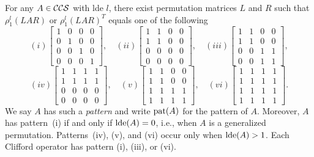 \documentclass[reprint,amsmath,amssymb,aps,pra]{revtex4-2}
\begin{document}
\begin{lemma}
  \label{lem:main}
  For any $A \in {\mathcal{CCS}}$ with lde $l$, there exist permutation
  matrices $L$ and $R$ such that $\rho_1^l(LAR)$ or $\rho_1^l(LAR)^T$
  equals one of the following
  \[
    (i)\begin{bmatrix}
      1 & 0 & 0 & 0 \\
      0 & 1 & 0 & 0 \\
      0 & 0 & 1 & 0 \\
      0 & 0 & 0 & 1
    \end{bmatrix},
    \quad(ii)\begin{bmatrix}
      1 & 1 & 0 & 0 \\
      1 & 1 & 0 & 0 \\
      0 & 0 & 0 & 0 \\
      0 & 0 & 0 & 0
    \end{bmatrix},
    \quad (iii)\begin{bmatrix}
      1 & 1 & 0 & 0 \\
      1 & 1 & 0 & 0 \\
      0 & 0 & 1 & 1 \\
      0 & 0 & 1 & 1
    \end{bmatrix},
  \]
  \[
    (iv)\begin{bmatrix}
      1 & 1 & 1 & 1 \\
      1 & 1 & 1 & 1 \\
      0 & 0 & 0 & 0 \\
      0 & 0 & 0 & 0
    \end{bmatrix},
    \quad(v)\begin{bmatrix}
      1 & 1 & 0 & 0 \\
      1 & 1 & 0 & 0 \\
      1 & 1 & 1 & 1 \\
      1 & 1 & 1 & 1
    \end{bmatrix},
    \quad(vi)\begin{bmatrix}
      1 & 1 & 1 & 1 \\
      1 & 1 & 1 & 1 \\
      1 & 1 & 1 & 1 \\
      1 & 1 & 1 & 1
    \end{bmatrix}.
  \]
  We say $A$ has such a \emph{pattern} and write $\operatorname{pat}(A)$ for the
  pattern of $A$. Moreover, $A$ has pattern~(i) if and only if
  $\operatorname{lde}(A)=0$, i.e., when $A$ is a generalized
  permutation. Patterns~(iv), (v), and (vi) occur only when
  $\operatorname{lde}(A)>1$. Each Clifford operator has pattern (i), (iii), or (vi).
\end{lemma}
\end{document}
